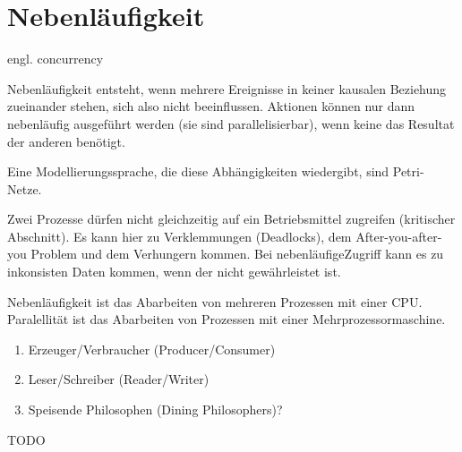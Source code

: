 \section{Nebenläufigkeit}

\begin{answer}
engl. concurrency

Nebenläufigkeit entsteht, wenn mehrere Ereignisse in keiner kausalen Beziehung zueinander stehen, sich also nicht beeinflussen. Aktionen können nur dann nebenläufig ausgeführt werden (sie sind parallelisierbar), wenn keine das Resultat der anderen benötigt.

Eine Modellierungssprache, die diese Abhängigkeiten wiedergibt, sind Petri-Netze.
\end{answer}

\begin{answer}
Zwei Prozesse dürfen nicht gleichzeitig auf ein Betriebsmittel zugreifen (kritischer Abschnitt). Es kann hier zu Verklemmungen (Deadlocks), dem After-you-after-you Problem und dem Verhungern kommen.
Bei nebenläufigeZugriff kann es zu inkonsisten Daten kommen, wenn der  nicht gewährleistet ist.
\end{answer}

\begin{answer}
Nebenläufigkeit ist das Abarbeiten von mehreren Prozessen mit einer CPU. Paralellität ist das Abarbeiten von Prozessen mit einer Mehrprozessormaschine.
\end{answer}

\begin{multilinequestion}
\begin{enumerate}
\item Erzeuger/Verbraucher (Producer/Consumer)
\item Leser/Schreiber (Reader/Writer)
\item Speisende Philosophen (Dining Philosophers)?
\end{enumerate}
\end{multilinequestion}
\begin{answer}
TODO
\end{answer}


